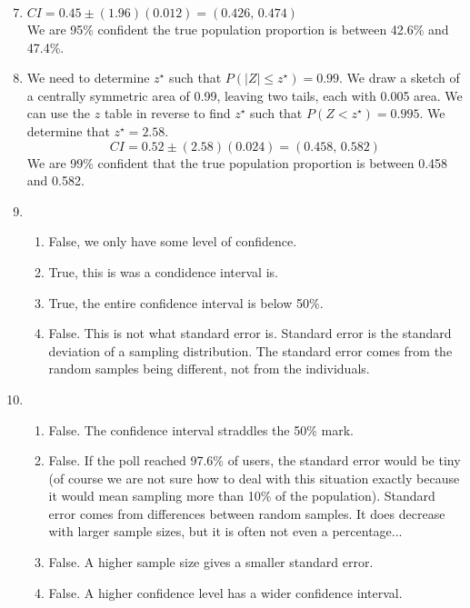 \documentclass[12pt,letterpaper]{article}
\begin{document}
\newcommand{\N}[2]{\mathcal{N}\big(#1,~#2\big)}
\newcommand{\Geo}[1]{\texttt{Geo}\big(#1\big)}
\newcommand{\B}[2]{\mathcal{B}\big(#1,~#2\big)}
\newcommand{\AND}{\textsc{~and~}}
\newcommand{\OR}{\textsc{~or~}}
\newcommand{\zs}{z^{\star}}

\begin{enumerate}
\setcounter{enumi}{6}
\item $CI = 0.45 \pm (1.96)(0.012) = (0.426,\,0.474)$\\
We are 95\% confident the true population proportion is between 42.6\% and 47.4\%.

\item We need to determine $z^{\star}$ such that $P(|Z| \le z^{\star}) = 0.99$. We draw a sketch of a centrally symmetric area of 0.99, leaving two tails, each with 0.005 area. We can use the $z$ table in reverse to find $\zs$ such that $P(Z<\zs) = 0.995$.  We determine that $\zs = 2.58$. 
$$CI = 0.52 \pm (2.58)(0.024) = (0.458,\,0.582)$$
We are 99\% confident that the true population proportion is between 0.458 and 0.582.

\item \begin{enumerate}
\item False, we only have some level of confidence.
\item True, this is was a condidence interval is.
\item True, the entire confidence interval is below 50\%.
\item False. This is not what standard error is. Standard error is the standard deviation of a sampling distribution. The standard error comes from the random samples being different, not from the individuals.
\end{enumerate}


\item \begin{enumerate}
\item False. The confidence interval straddles the 50\% mark.
\item False. If the poll reached 97.6\% of users, the standard error would be tiny (of course we are not sure how to deal with this situation exactly because it would mean sampling more than 10\% of the population). Standard error comes from differences between random samples. It does decrease with larger sample sizes, but it is often not even a percentage... 
\item False. A higher sample size gives a smaller standard error.
\item False. A higher confidence level has a wider confidence interval.
\end{enumerate}


\end{enumerate}
\end{document}
